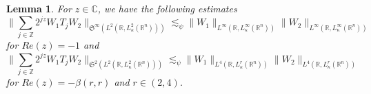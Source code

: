 \documentclass[a4paper,11pt, reqno]{amsart}
\numberwithin{equation}{section}
\theoremstyle{plain}
\newtheorem{lemma}[theorem]{Lemma}
\theoremstyle{definition}
\theoremstyle{remark}
\begin{document}
\begin{lemma}For $z\in \mathbb{C}$, we have the following estimates
\begin{equation}\label{lemma-1}
	\big\|\sum\limits_{j\in\mathbb{Z}} 2^{jz}W_1T_jW_2\big\|_{\mathfrak{S}^\infty(L^2(\mathbb{R}, L_\kappa^2(\mathbb{R}^n)))}\lesssim_\psi \big\|W_1\big\|_{L^\infty(\mathbb{R}, L_\kappa^\infty(\mathbb{R}^n))} \big\|W_2\big\|_{L^\infty(\mathbb{R}, L_\kappa^\infty(\mathbb{R}^n))}
		\end{equation}
  for $Re(z)=-1$ and
    \begin{equation}\label{lemma-2}
	\big\|\sum\limits_{j\in\mathbb{Z}} 2^{jz}W_1T_jW_2\big\|_{\mathfrak{S}^{2}(L^2(\mathbb{R}, L_\kappa^2(\mathbb{R}^n)))}\lesssim_\psi \big\|W_1\big\|_{L^{4}(\mathbb{R}, L_\kappa^{r}(\mathbb{R}^n))} \big\|W_2\big\|_{L^{4}(\mathbb{R}, L_\kappa^{r}(\mathbb{R}^n))}
		\end{equation}
  for $Re(z)=-\beta(r,r)$ and $r\in (2,4)$.
\end{lemma}
\end{document}

